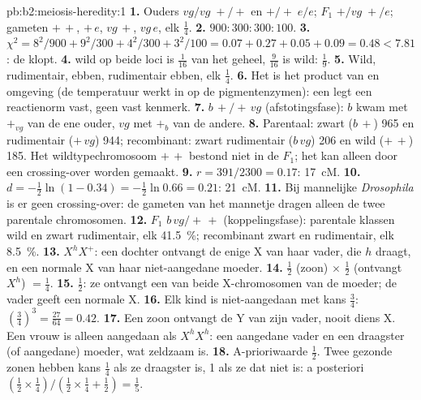 \begin{solution}{pb:b2:meiosis-heredity:1}
\textbf{1.} Ouders $vg/vg\;+/+$ en $+/+\;e/e$; $F_1$ $+/vg\;+/e$;
gameten $+\,+$, $+\,e$, $vg\,+$, $vg\,e$, elk $\tfrac14$.
\textbf{2.} $900 : 300 : 300 : 100$.
\textbf{3.} $\chi^2 = 8^2/900 + 9^2/300 + 4^2/300 + 3^2/100 = 0.07 +
0.27 + 0.05 + 0.09 = 0.48 < 7.81$: de  klopt.
\textbf{4.}  wild op beide loci is $\tfrac{1}{16}$ van het geheel,
$\tfrac{9}{16}$ is wild: $\tfrac19$.
\textbf{5.} Wild, rudimentair, ebben, rudimentair ebben, elk $\tfrac14$.
\textbf{6.} Het  is het product van  en omgeving
(de temperatuur werkt in op de pigmentenzymen): een  legt een
reactienorm vast, geen vast kenmerk.
\textbf{7.} $b\,+/+\,vg$ (afstotingsfase): $b$ kwam met $+_{vg}$ van de ene
ouder, $vg$ met $+_b$ van de andere.
\textbf{8.} Parentaal: zwart ($b\,+$) 965 en rudimentair ($+\,vg$) 944;
recombinant: zwart rudimentair ($b\,vg$) 206 en wild ($+\,+$) 185.
Het wildtypechromosoom $+\,+$ bestond niet in de $F_1$; het kan
alleen door een crossing-over worden gemaakt.
\textbf{9.} $r = 391/2300 = 0.17$: \qty{17}{cM}.
\textbf{10.} $d = -\tfrac12\ln(1 - 0.34) = -\tfrac12\ln 0.66 = 0.21$:
\qty{21}{cM}.
\textbf{11.} Bij mannelijke \emph{Drosophila} is er geen crossing-over:
de gameten van het mannetje dragen alleen de twee parentale chromosomen.
\textbf{12.} $F_1$ $b\,vg/+\,+$ (koppelingsfase): parentale klassen wild en
zwart rudimentair, elk \qty{41.5}{\%}; recombinant zwart en
rudimentair, elk \qty{8.5}{\%}.
\textbf{13.} $X^hX^+$: een dochter ontvangt de enige X van haar vader, die
$h$ draagt, en een normale X van haar niet-aangedane moeder.
\textbf{14.} $\tfrac12$ (zoon) $\times$ $\tfrac12$ (ontvangt $X^h$) $=
\tfrac14$.
\textbf{15.} $\tfrac12$: ze ontvangt een van beide X-chromosomen van de
moeder; de vader geeft een normale X.
\textbf{16.} Elk kind is niet-aangedaan met kans $\tfrac34$:
$(\tfrac34)^3 = \tfrac{27}{64} = 0.42$.
\textbf{17.} Een zoon ontvangt de Y van zijn vader, nooit diens X. Een vrouw
is alleen aangedaan als $X^hX^h$: een aangedane vader en een draagster (of
aangedane) moeder, wat zeldzaam is.
\textbf{18.} A-prioriwaarde $\tfrac12$. Twee gezonde zonen hebben kans
$\tfrac14$ als ze draagster is, 1 als ze dat niet is: a posteriori $(\tfrac12\times
\tfrac14)/(\tfrac12\times\tfrac14 + \tfrac12) = \tfrac15$.

\end{solution}
